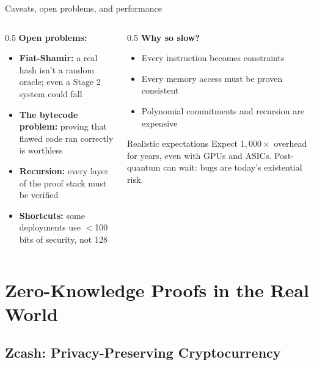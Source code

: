 \ifdefined\PRESENTATION\else\PassOptionsToClass{handout}{beamer}\fi\documentclass[aspectratio=169, lualatex]{beamer}
\begin{document}
\begin{frame}{Caveats, open problems, and performance}
	\begin{columns}[T]
		\begin{column}{0.5\textwidth}
			\textbf{Open problems:}
			\begin{itemize}
				\item \textbf{Fiat-Shamir:} a real hash isn't a random oracle; even a Stage 2 system could fall
				\item \textbf{The bytecode problem:} proving that flawed code ran correctly is worthless
				\item \textbf{Recursion:} every layer of the proof stack must be verified
				\item \textbf{Shortcuts:} some deployments use $<$100 bits of security, not 128
			\end{itemize}
		\end{column}
		\begin{column}{0.5\textwidth}
			\textbf{Why so slow?}
			\begin{itemize}
				\item Every instruction becomes constraints
				\item Every memory access must be proven consistent
				\item Polynomial commitments and recursion are expensive
			\end{itemize}
			\begin{alertblock}{Realistic expectations}
				Expect $1{,}000\times$ overhead for years, even with GPUs and ASICs. Post-quantum can wait: bugs are today's existential risk.
			\end{alertblock}
		\end{column}
	\end{columns}
\end{frame}

\section{Zero-Knowledge Proofs in the Real World}

\subsection{Zcash: Privacy-Preserving Cryptocurrency}
\end{document}
